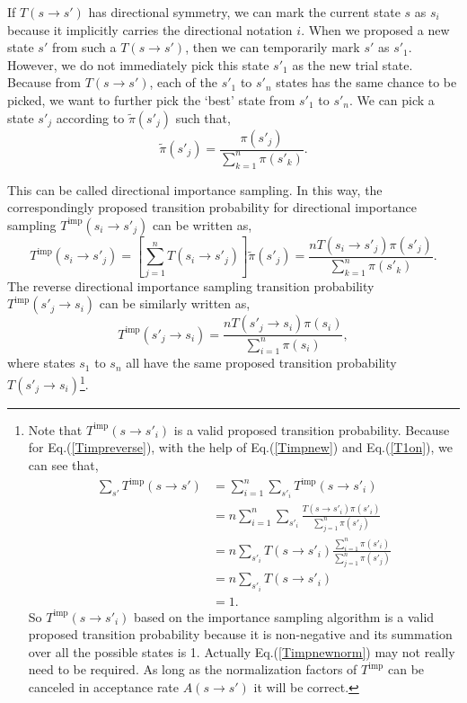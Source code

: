 \documentclass[12pt,letterpaper,UTF8]{report}
\begin{document}
If $T(s\rightarrow s')$ has directional symmetry, we can mark the current state $s$ as $s_i$ because it implicitly carries the directional notation $i$.
When we proposed a new state $s'$ from such a $T(s\rightarrow s')$, then we can temporarily mark $s'$ as $s'_1$.
However, we do not immediately pick this state $s'_1$ as the new trial state. Because from $T(s\rightarrow s')$, each of the $s'_1$ to $s'_n$ states has the same chance to be picked, we want to further pick the `best' state from $s'_1$ to $s'_n$.
We can pick a state $s'_j$ according to $\tilde{\pi}(s'_j)$ such that,
\begin{equation}
\tilde{\pi}(s'_j)=\frac{\pi(s'_j)}{\sum_{k=1}^n \pi(s'_k)} .
\label{imppinewdist}
\end{equation}

This can be called directional importance sampling.
In this way, the correspondingly proposed transition probability for directional importance sampling $T^{\textrm{imp}}(s_i\rightarrow s'_j) $  can be written as,
\begin{equation}
T^{\textrm{imp}}(s_i\rightarrow s'_j)
= \left[ \sum_{j=1}^n T(s_i\rightarrow s'_j)  \right] \tilde{\pi}(s'_j)
= \frac{ n T(s_i\rightarrow s'_j) \pi(s'_j)}{\sum_{k=1}^n \pi(s'_k)}.
 \label{Timpnewsi}
\end{equation}
The reverse directional importance sampling transition probability $T^{\textrm{imp}}(s'_j\rightarrow s_i) $  can be similarly written as,
\begin{equation}
T^{\textrm{imp}}(s'_j\rightarrow s_i)
= \frac{ n T(s'_j\rightarrow s_i) \pi(s_i)}{\sum_{i=1}^n \pi(s_i)},
\label{Timpreverse}
\end{equation}
where states $s_1$ to $s_n$ all have the same proposed transition probability $T(s'_j\rightarrow s_i)$\footnote{
Note that $T^{\textrm{imp}}(s\rightarrow s'_i) $ is a valid proposed transition probability. Because for Eq.(\ref{Timpreverse}), with the help of Eq.(\ref{Timpnew}) and Eq.(\ref{T1on}), we can see that,
\begin{align}
\sum_{s'} T^{\textrm{imp}}(s\rightarrow s') &=  \sum_{i=1}^n \sum_{s'_i} T^{\textrm{imp}}(s\rightarrow s'_i) \nonumber \\
&= n \sum_{i=1}^n \sum_{s'_i}  \frac{T(s\rightarrow s'_i) \pi(s'_i)}{\sum_{j=1}^n \pi(s'_j)} \nonumber \\
&= n  \sum_{s'_i} T(s\rightarrow s'_i) \frac{\sum_{i=1}^n \pi(s'_i)}{\sum_{j=1}^n \pi(s'_j)} \nonumber \\
&= n \sum_{s'_i} T(s \rightarrow s'_i) \nonumber \\
&= 1 . \label{Timpnewnorm}
\end{align}
So $T^{\textrm{imp}}(s\rightarrow s'_i) $ based on the importance sampling algorithm is a valid proposed transition probability because it is non-negative and its summation over all the possible states is 1.
Actually Eq.(\ref{Timpnewnorm}) may not really need to be required. As long as the normalization factors of $T^{\textrm{imp}}$ can be canceled in acceptance rate $A(s \rightarrow s')$ it will be correct.
}.
\end{document}

